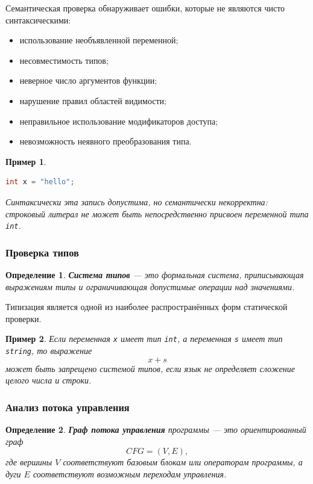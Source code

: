 \documentclass[12pt,a4paper]{article}
\newtheorem{definition}{Определение}
\newtheorem{example}{Пример}
\begin{document}
Семантическая проверка обнаруживает ошибки, которые не являются чисто синтаксическими:

\begin{itemize}
  \item использование необъявленной переменной;
  \item несовместимость типов;
  \item неверное число аргументов функции;
  \item нарушение правил областей видимости;
  \item неправильное использование модификаторов доступа;
  \item невозможность неявного преобразования типа.
\end{itemize}

\begin{example}
\begin{lstlisting}[language=C]
int x = "hello";
\end{lstlisting}
Синтаксически эта запись допустима, но семантически некорректна: строковый литерал не может быть непосредственно присвоен переменной типа \texttt{int}.
\end{example}

\subsubsection{Проверка типов}

\begin{definition}
\textbf{Система типов} --- это формальная система, приписывающая выражениям типы и ограничивающая допустимые операции над значениями.
\end{definition}

Типизация является одной из наиболее распространённых форм статической проверки.

\begin{example}
Если переменная \texttt{x} имеет тип \texttt{int}, а переменная \texttt{s} имеет тип \texttt{string}, то выражение
\[
x + s
\]
может быть запрещено системой типов, если язык не определяет сложение целого числа и строки.
\end{example}

\subsubsection{Анализ потока управления}

\begin{definition}
\textbf{Граф потока управления} программы --- это ориентированный граф
\[
CFG = (V, E),
\]
где вершины $V$ соответствуют базовым блокам или операторам программы, а дуги $E$ соответствуют возможным переходам управления.
\end{definition}
\end{document}
